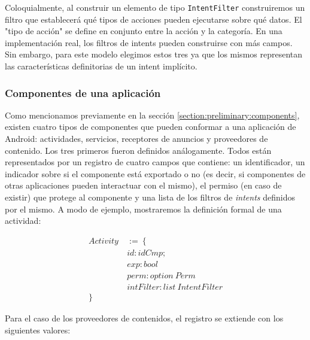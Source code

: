 Coloquialmente, al construir un elemento de tipo \texttt{IntentFilter} construiremos un filtro que
establecerá qué tipos de acciones pueden ejecutarse sobre qué datos. El "tipo de acción" se define en
conjunto entre la acción y la categoría. En una implementación real, los filtros de intents pueden
construirse con más campos. Sin embargo, para este modelo elegimos estos tres ya que los mismos
representan las características definitorias de un intent implícito\cite{android-intents}.

\subsubsection*{Componentes de una aplicación}
Como mencionamos previamente en la sección \ref{section:preliminary:components}, existen cuatro tipos de
componentes que pueden conformar a una aplicación de Android: actividades, servicios, receptores de
anuncios y proveedores de contenido. Los tres primeros fueron definidos análogamente. Todos están
representados por un registro de cuatro campos que contiene: un identificador, un indicador sobre si el
componente está exportado o no (es decir, si componentes de otras aplicaciones pueden interactuar con el
mismo), el permiso (en caso de existir) que protege al componente y una lista de los filtros de
\textit{intents} definidos por el mismo. A modo de ejemplo, mostraremos la definición formal de una
actividad:

\begin{align*}
    Activity\  & :=\ \{                        \\
               & id: idCmp;                    \\
               & exp: bool                     \\
               & perm: option\ Perm            \\
               & intFilter: list\ IntentFilter \\
    \}
\end{align*}

Para el caso de los proveedores de contenidos, el registro se extiende con los siguientes valores:

